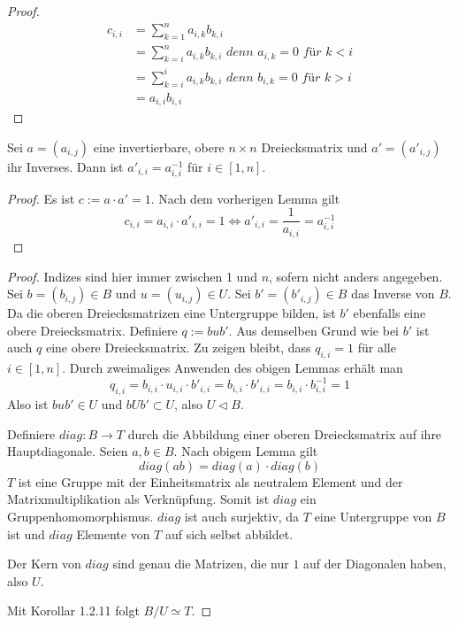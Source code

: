 \documentclass[10pt,a4paper]{article}
\begin{document}
\begin{proof}
  \begin{align*}
    c_{i, i} & = \sum_{k = 1}^{n} a_{i, k} b_{k, i}\\
    & = \sum_{k = i}^{n} a_{i, k} b_{k, i}\textit{ denn $a_{i, k} = 0$ für $k < i$}\\
    & = \sum_{k = i}^{i} a_{i, k} b_{k, i}\textit{ denn $b_{i, k} = 0$ für $k > i$}\\
    & = a_{i, i} b_{i, i}
  \end{align*}
\end{proof}

\begin{corollary}
  Sei $a = (a_{i, j})$ eine invertierbare, obere $n \times n$ Dreiecksmatrix und $a' = (a'_{i, j})$ ihr Inverses.
  Dann ist $a'_{i, i} = a_{i, i}^{-1}$ für $i \in [1, n]$.
\end{corollary}

\begin{proof}
  Es ist $c := a \cdot a' = 1$.
  Nach dem vorherigen Lemma gilt
  \begin{equation}
    c_{i, i} = a_{i, i} \cdot a'_{i, i} = 1 \Leftrightarrow a'_{i, i} = \frac{1}{a_{i, i}} = a_{i, i}^{-1}
  \end{equation}
\end{proof}

\begin{proof}
  Indizes sind hier immer zwischen 1 und $n$, sofern nicht anders angegeben.
  Sei $b = (b_{i, j}) \in B$ und $u = (u_{i, j}) \in U$.
  Sei $b' = (b'_{i, j}) \in B$ das Inverse von $B$.
  Da die oberen Dreiecksmatrizen eine Untergruppe bilden, ist $b'$ ebenfalls eine obere Dreiecksmatrix.
  Definiere $q := bub'$.
  Aus demselben Grund wie bei $b'$ ist auch $q$ eine obere Dreiecksmatrix.
  Zu zeigen bleibt, dass $q_{i, i} = 1$ für alle $i \in [1, n]$.
  Durch zweimaliges Anwenden des obigen Lemmas erhält man
  \begin{equation}
    q_{i, i} = b_{i, i} \cdot u_{i, i} \cdot b'_{i, i} = b_{i, i} \cdot b'_{i, i} = b_{i, i} \cdot b_{i, i}^{-1} = 1
  \end{equation}
  Also ist $bub' \in U$ und $bUb' \subset U$, also $U \triangleleft B$.

  Definiere $diag : B \rightarrow T$ durch die Abbildung einer oberen Dreiecksmatrix auf ihre Hauptdiagonale.
  Seien $a, b \in B$.
  Nach obigem Lemma gilt
  \begin{equation}
    diag(ab) = diag(a) \cdot diag(b)
  \end{equation}
  $T$ ist eine Gruppe mit der Einheitsmatrix als neutralem Element und der Matrixmultiplikation als Verknüpfung.
  Somit ist $diag$ ein Gruppenhomomorphismus.
  $diag$ ist auch surjektiv, da $T$ eine Untergruppe von $B$ ist und $diag$ Elemente von $T$ auf sich selbst abbildet.

  Der Kern von $diag$ sind genau die Matrizen, die nur $1$ auf der Diagonalen haben, also $U$.

  Mit Korollar 1.2.11 folgt $B / U \simeq T$.
\end{proof}
\end{document}
